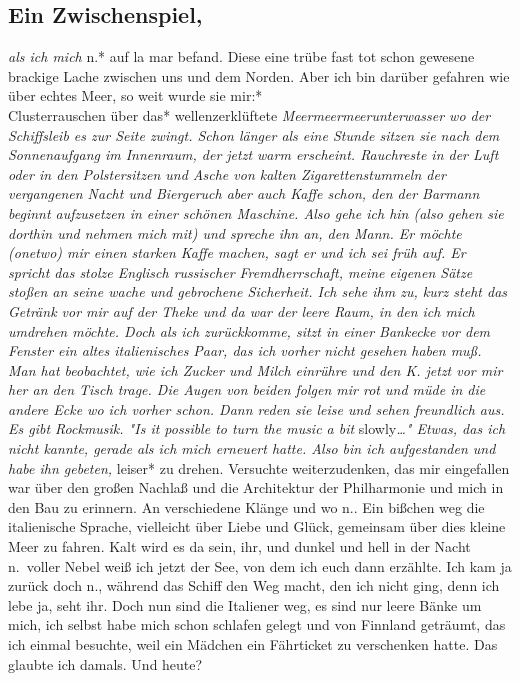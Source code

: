 \documentclass[
]{article}
\author{}
\date{\vspace{-2.5em}}
\begin{document}
\subsection{Ein Zwischenspiel,}\label{ein-zwischenspiel}

\emph{als ich mich }n.* auf la mar befand. Diese eine trübe fast tot
schon gewesene brackige Lache zwischen uns und dem Norden. Aber ich bin
darüber gefahren wie über echtes Meer, so weit wurde sie mir:*\\
Clusterrauschen über das* wellenzerklüftete
\emph{Meermeermeerunterwasser wo der Schiffsleib es zur Seite zwingt.
Schon länger als eine Stunde sitzen sie nach dem Sonnenaufgang im
Innenraum, der jetzt warm erscheint. Rauchreste in der Luft oder in den
Polstersitzen und Asche von kalten Zigarettenstummeln der vergangenen
Nacht und Biergeruch aber auch Kaffe schon, den der Barmann beginnt
aufzusetzen in einer schönen Maschine. Also gehe ich hin (also gehen sie
dorthin und nehmen mich mit) und spreche ihn an, den Mann. Er möchte
(onetwo) mir einen starken Kaffe machen, sagt er und ich sei früh auf.
Er spricht das stolze Englisch russischer Fremdherrschaft, meine eigenen
Sätze stoßen an seine wache und gebrochene Sicherheit. Ich sehe ihm zu,
kurz steht das Getränk vor mir auf der Theke und da war der leere Raum,
in den ich mich umdrehen möchte. Doch als ich zurückkomme, sitzt in
einer Bankecke vor dem Fenster ein altes italienisches Paar, das ich
vorher nicht gesehen haben muß. Man hat beobachtet, wie ich Zucker und
Milch einrühre und den K. jetzt vor mir her an den Tisch trage. Die
Augen von beiden folgen mir rot und müde in die andere Ecke wo ich
vorher schon. Dann reden sie leise und sehen freundlich aus. Es gibt
Rockmusik. "Is it possible to turn the music a bit }slowly\emph{\ldots"
Etwas, das ich nicht kannte, gerade als ich mich erneuert hatte. Also
bin ich aufgestanden und habe ihn gebeten, }leiser* zu drehen. Versuchte
weiterzudenken, das mir eingefallen war über den großen Nachlaß und die
Architektur der Philharmonie und mich in den Bau zu erinnern. An
verschiedene Klänge und wo n.. Ein bißchen weg die italienische Sprache,
vielleicht über Liebe und Glück, gemeinsam über dies kleine Meer zu
fahren. Kalt wird es da sein, ihr, und dunkel und hell in der Nacht
n.~voller Nebel weiß ich jetzt der See, von dem ich euch dann erzählte.
Ich kam ja zurück doch n., während das Schiff den Weg macht, den ich
nicht ging, denn ich lebe ja, seht ihr. Doch nun sind die Italiener weg,
es sind nur leere Bänke um mich, ich selbst habe mich schon schlafen
gelegt und von Finnland geträumt, das ich einmal besuchte, weil ein
Mädchen ein Fährticket zu verschenken hatte. Das glaubte ich damals. Und
heute?
\end{document}
